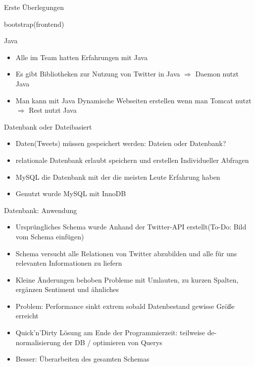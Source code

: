 \begin{frame}{Erste Überlegungen}

bootstrap(frontend)
\end{frame}


\begin{frame}{Java}
	\begin{itemize}
	\item Alle im Team hatten Erfahrungen mit Java
	\item Es gibt Bibliotheken zur Nutzung von Twitter in Java $\Rightarrow$ Daemon nutzt Java
	\item Man kann mit Java Dynamische Webseiten erstellen wenn man Tomcat nutzt $\Rightarrow$ Rest nutzt Java
	\end{itemize}
\end{frame}


\begin{frame}{Datenbank oder Dateibasiert}
	\begin{itemize}
		\item Daten(Tweets) müssen gespeichert werden: Dateien oder Datenbank?
		\item relationale Datenbank erlaubt speichern und erstellen Individueller Abfragen
		\item MySQL die Datenbank mit der die meisten Leute Erfahrung haben
		\item Genutzt wurde MySQL mit InnoDB 
	\end{itemize}
\end{frame}

\begin{frame}{Datenbank: Anwendung}
	\begin{itemize}
	\item Ursprüngliches Schema wurde Anhand der Twitter-API erstellt(To-Do: Bild vom Schema einfügen)
	\item Schema versucht alle Relationen von Twitter abzubilden und alle für uns relevanten Informationen zu liefern
	\item Kleine Änderungen behoben Probleme mit Umlauten, zu kurzen Spalten, ergänzen Sentiment und ähnliches
	\item Problem: Performance sinkt extrem sobald Datenbestand gewisse Größe erreicht
	\item Quick'n'Dirty Lösung am Ende der Programmierzeit: teilweise de-normalisierung der DB / optimieren von Querys
	\item Besser: Überarbeiten des gesamten Schemas
	\end{itemize}
\end{frame}

